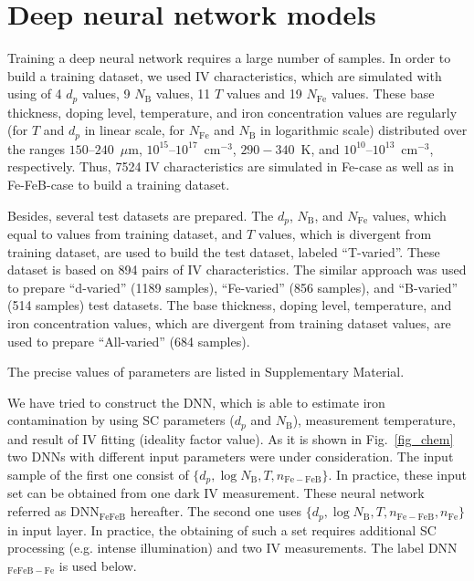 \documentclass[a4paper,fleqn]{cas-sc}
\begin{document}
\section{Deep neural network models}

Training a deep neural network requires a large number of samples.
In order to build a training dataset, we used IV characteristics, which
are simulated with using of 4 $d_p$ values, 9 $N_\mathrm{B}$ values, 11 $T$ values and 19 $N_{\mathrm{Fe}}$ values.
These base thickness, doping level, temperature, and iron concentration values are regularly (for $T$ and $d_p$ in linear scale, for $N_{\mathrm{Fe}}$ and $N_\mathrm{B}$ in logarithmic scale) distributed over the  ranges $150$--$240$~$\mu$m, $10^{15}$--$10^{17}$~cm$^{-3}$, $290-340$~K, and
$10^{10}$--$10^{13}$~cm$^{-3}$, respectively.
Thus, 7524 IV characteristics are simulated in Fe-case as well as in Fe-FeB-case to build a training dataset.


Besides, several test datasets are prepared.
The $d_p$, $N_\mathrm{B}$, and $N_{\mathrm{Fe}}$ values, which equal to  values from training dataset, and $T$ values, which is divergent from training dataset, are used to build the test dataset, labeled ``T-varied''.
These dataset is based on 894 pairs of IV characteristics.
The similar approach was used to prepare ``d-varied'' (1189 samples), ``Fe-varied'' (856 samples), and ``B-varied'' (514 samples) test datasets.
The base thickness, doping level, temperature, and iron concentration values, which are divergent from training dataset values, are used to prepare ``All-varied'' (684 samples).

The precise values of parameters are listed in Supplementary Material.

We have tried to construct the DNN, which is able to estimate iron contamination by using
SC parameters ($d_p$ and $N_\mathrm{B}$),  measurement temperature, and result of IV fitting (ideality factor value).
As it is shown in Fig.~\ref{fig_chem} two DNNs with different input parameters were under consideration.
The input sample of the first one consist of $\{d_p,\log N_\mathrm{B},T,n_\mathrm{Fe-FeB}\}$.
In practice, these input set can be obtained from one dark IV measurement.
These neural network referred as DNN$_\mathrm{FeFeB}$ hereafter.
The second one uses  $\{d_p,\log N_\mathrm{B},T,n_\mathrm{Fe-FeB},n_\mathrm{Fe}\}$ in input layer.
In practice, the obtaining of such a set requires additional SC processing (e.g. intense illumination) and two IV measurements.
The label  DNN$_\mathrm{FeFeB-Fe}$ is used below.
\end{document}
